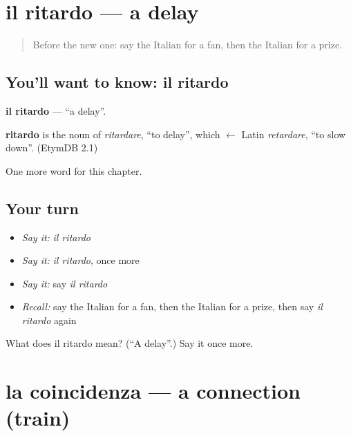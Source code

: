 \section[il ritardo]{il ritardo — a delay}

\label{lesson:IT-C258-ritardo}



\begin{quote}
Before the new one: say the Italian for a fan, then the Italian for a prize.
\end{quote}

\subsection*{You'll want to know: il ritardo}
\textbf{il ritardo} — \textquotedblleft{}a delay\textquotedblright{}.

\begin{cousinweb}
\textbf{ritardo} is the noun of \emph{ritardare}, \textquotedblleft{}to delay\textquotedblright{}, which $\leftarrow$ Latin \emph{retardare}, \textquotedblleft{}to slow down\textquotedblright{}. (EtymDB 2.1)
\end{cousinweb}

\begin{grammarlens}[title={What you've built}]
One more word for this chapter.
\end{grammarlens}

\subsection*{Your turn}
\begin{itemize}
\raggedright
  \item \emph{Say it:} \emph{il ritardo}
  \item \emph{Say it:} \emph{il ritardo}, once more
  \item \emph{Say it:} say \emph{il ritardo}
  \item \emph{Recall:} say the Italian for a fan, then the Italian for a prize, then say \emph{il ritardo} again
\end{itemize}

\begin{tcolorbox}[breakable,colback=teal!4,colframe=teal!35!black,title={Before you move on}]
What does il ritardo mean? (\textquotedblleft{}A delay\textquotedblright{}.) Say it once more.
\end{tcolorbox}
\section[la coincidenza]{la coincidenza — a connection (train)}

